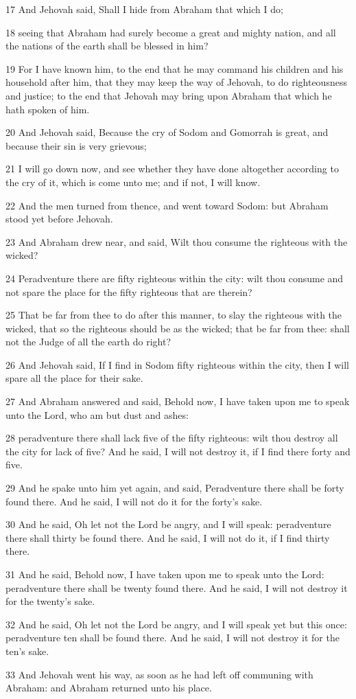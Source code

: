 \par 17 And Jehovah said, Shall I hide from Abraham that which I do;
\par 18 seeing that Abraham had surely become a great and mighty nation, and all the nations of the earth shall be blessed in him?
\par 19 For I have known him, to the end that he may command his children and his household after him, that they may keep the way of Jehovah, to do righteousness and justice; to the end that Jehovah may bring upon Abraham that which he hath spoken of him.
\par 20 And Jehovah said, Because the cry of Sodom and Gomorrah is great, and because their sin is very grievous;
\par 21 I will go down now, and see whether they have done altogether according to the cry of it, which is come unto me; and if not, I will know.
\par 22 And the men turned from thence, and went toward Sodom: but Abraham stood yet before Jehovah.
\par 23 And Abraham drew near, and said, Wilt thou consume the righteous with the wicked?
\par 24 Peradventure there are fifty righteous within the city: wilt thou consume and not spare the place for the fifty righteous that are therein?
\par 25 That be far from thee to do after this manner, to slay the righteous with the wicked, that so the righteous should be as the wicked; that be far from thee: shall not the Judge of all the earth do right?
\par 26 And Jehovah said, If I find in Sodom fifty righteous within the city, then I will spare all the place for their sake.
\par 27 And Abraham answered and said, Behold now, I have taken upon me to speak unto the Lord, who am but dust and ashes:
\par 28 peradventure there shall lack five of the fifty righteous: wilt thou destroy all the city for lack of five? And he said, I will not destroy it, if I find there forty and five.
\par 29 And he spake unto him yet again, and said, Peradventure there shall be forty found there. And he said, I will not do it for the forty's sake.
\par 30 And he said, Oh let not the Lord be angry, and I will speak: peradventure there shall thirty be found there. And he said, I will not do it, if I find thirty there.
\par 31 And he said, Behold now, I have taken upon me to speak unto the Lord: peradventure there shall be twenty found there. And he said, I will not destroy it for the twenty's sake.
\par 32 And he said, Oh let not the Lord be angry, and I will speak yet but this once: peradventure ten shall be found there. And he said, I will not destroy it for the ten's sake.
\par 33 And Jehovah went his way, as soon as he had left off communing with Abraham: and Abraham returned unto his place.

